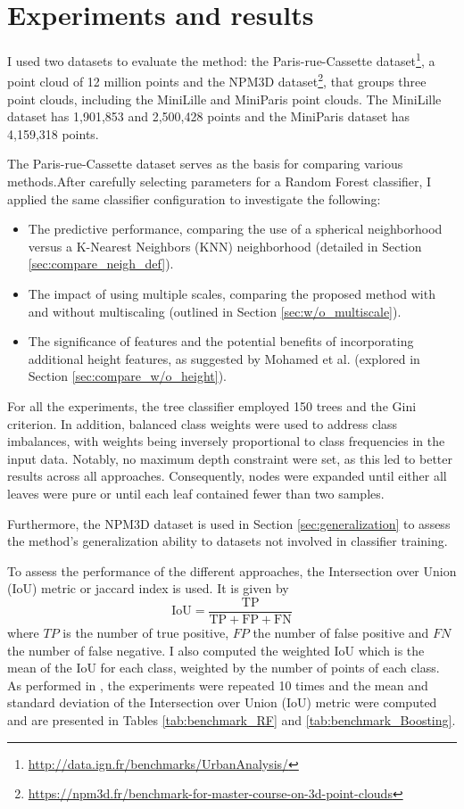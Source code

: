 \documentclass{article}
\begin{document}
\section{Experiments and results}\label{sec:experiments}
I used two datasets to evaluate the method: the Paris-rue-Cassette dataset\footnote{\url{http://data.ign.fr/benchmarks/UrbanAnalysis/}}, a point cloud of 12 million points and the NPM3D dataset\footnote{\url{https://npm3d.fr/benchmark-for-master-course-on-3d-point-clouds}}, that groups three point clouds, including the MiniLille and MiniParis point clouds. The MiniLille dataset has 1,901,853 and 2,500,428 points and the MiniParis dataset has 4,159,318 points. 

The Paris-rue-Cassette dataset serves as the basis for comparing various methods.After carefully selecting parameters for a Random Forest classifier, I applied the same classifier configuration to investigate the following:
\begin{itemize}
    \item The predictive performance, comparing the use of a spherical neighborhood versus a K-Nearest Neighbors (KNN) neighborhood (detailed in Section \ref{sec:compare_neigh_def}).
    \item The impact of using multiple scales, comparing the proposed method with and without multiscaling (outlined in Section \ref{sec:w/o_multiscale}).
    \item The significance of features and the potential benefits of incorporating additional height features, as suggested by Mohamed et al. \cite{mohamed_improvement_2022} (explored in Section \ref{sec:compare_w/o_height}).
\end{itemize}
For all the experiments, the tree classifier employed 150 trees and the Gini criterion. In addition, balanced class weights were used to address class imbalances, with weights being inversely proportional to class frequencies in the input data. Notably, no maximum depth constraint were set, as this led to better results across all approaches. Consequently, nodes were expanded until either all leaves were pure or until each leaf contained fewer than two samples.
    
Furthermore, the NPM3D dataset is used in Section \ref{sec:generalization} to assess the method's generalization ability to datasets not involved in classifier training.

To assess the performance of the different approaches, the Intersection over Union (IoU) metric or jaccard index is used. It is given by 
$$
\textrm{IoU} = \frac{\textrm{TP}}{\textrm{TP} + \textrm{FP} + \textrm{FN}}
$$
where $TP$ is the number of true positive, $FP$ the number of false positive and $FN$ the number of false negative. I also computed the weighted IoU which is the mean of the IoU for each class, weighted by the number of points of each class. As performed in \cite{thomas_semantic_2018}, the experiments were repeated 10 times and the mean and standard deviation of the Intersection over Union (IoU) metric were computed and are presented in Tables \ref{tab:benchmark_RF} and \ref{tab:benchmark_Boosting}.
\end{document}
